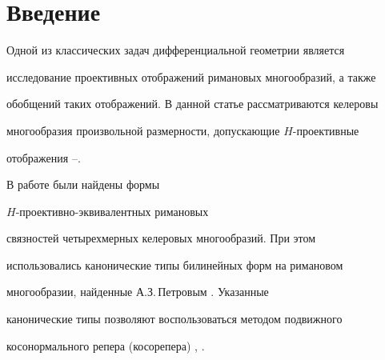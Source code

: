 \date{}







\pagestyle{plain} %













\maketitle


\label{begin}





\section*{Введение}





Одной из классических задач дифференциальной геометрии является


исследование проективных отображений римановых многообразий, а также


обобщений таких отображений. В данной статье рассматриваются келеровы


многообразия произвольной размерности, допускающие $H$-проективные


отображения \cite{amka1}--\cite{sin1}.





В работе \cite{amka1} были найдены формы


$H$-проективно-эквивалентных римановых


связностей четырехмерных келеровых многообразий. При этом


использовались канонические типы билинейных форм на римановом


многообразии, найденные А.З.\,Петровым \cite{pet1}. Указанные


канонические типы позволяют воспользоваться методом подвижного


косонормального репера (косорепера) \cite{aa-1}, \cite{am1}.





